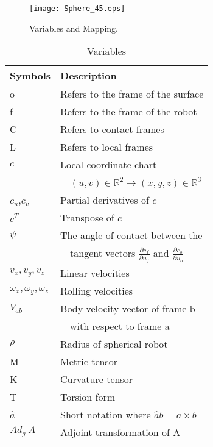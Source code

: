 \documentclass[journal]{IEEEtran}
\begin{document}
\begin{figure}
\centering
\hspace{0cm}
    \texttt{[image: Sphere\_45.eps]}
    \vspace{0cm}
    \caption{Variables and Mapping.}
    \label{fig:sim}
\end{figure}

 \begin{table}[htp]

\caption{ Variables}

\centering
\begin{tabular}{ll}
\\
\hline
\hline
Symbols & Description\\
\hline
o & Refers to the frame of the surface\\
f & Refers to the frame of the robot\\
C & Refers to contact frames\\
L & Refers to local frames\\
$c$ & Local coordinate chart\\
  & \ \ $(u,v) \in \mathbb{R}^2 \rightarrow (x,y,z) \in \mathbb{R}^3$\\
$c_u$,$c_v$ & Partial derivatives of $c$\\
$c^T$ & Transpose of $c$\\
$\psi$   & The angle of contact between the \\
  & \ \ tangent vectors $\frac{\partial c_f}{\partial u_f}$ and $\frac{\partial c_o}{\partial u_o}$\\
$v_x,v_y,v_z$ & Linear velocities\\
$\omega_x,\omega_y,\omega_z$ & Rolling velocities\\
$V_{ab}$ & Body velocity vector of frame b \\
  & \ \ with respect to frame a\\
$\rho$ & Radius of spherical robot\\
M & Metric tensor\\
K & Curvature tensor\\
T & Torsion form\\
$\hat{a}$ & Short notation where $\hat{a}b = a \times b$\\
$Ad_g~A$  & Adjoint transformation of A\\
\hline
\hline
\end{tabular}
\end{table}
\end{document}
